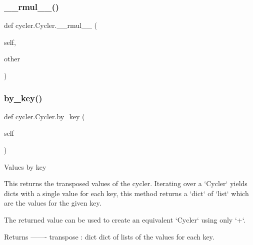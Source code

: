 \mbox{\label{classcycler_1_1Cycler_a3f88390af4b592094c0a5a6bc4984eaa}} 
\subsubsection{\texorpdfstring{\+\_\+\+\_\+rmul\+\_\+\+\_\+()}{\_\_rmul\_\_()}}
{\footnotesize\ttfamily def cycler.\+Cycler.\+\_\+\+\_\+rmul\+\_\+\+\_\+ (\begin{DoxyParamCaption}\item[{}]{self,  }\item[{}]{other }\end{DoxyParamCaption})}

\mbox{\label{classcycler_1_1Cycler_aff0cddb733ac75e56fe420b00d108efd}} 
\subsubsection{\texorpdfstring{by\+\_\+key()}{by\_key()}}
{\footnotesize\ttfamily def cycler.\+Cycler.\+by\+\_\+key (\begin{DoxyParamCaption}\item[{}]{self }\end{DoxyParamCaption})}

\begin{DoxyVerb}Values by key

This returns the transposed values of the cycler.  Iterating
over a `Cycler` yields dicts with a single value for each key,
this method returns a `dict` of `list` which are the values
for the given key.

The returned value can be used to create an equivalent `Cycler`
using only `+`.

Returns
-------
transpose : dict
    dict of lists of the values for each key.
\end{DoxyVerb}
 \mbox{\label{classcycler_1_1Cycler_adb8c9f43e8d31300275bf09cbce14c0a}} 
